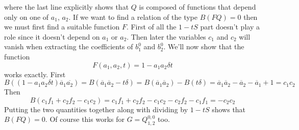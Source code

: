 \documentclass[12pt]{article}
\theoremstyle{definition} \newtheorem{definition}[theorem]{Definition}
\newcommand{\ol}[1]{\overline{#1}}
\newcommand{\Qf}[1]{Q_{1,2}^{#1}}
\begin{document}
where the last line explicitly shows that $Q$ is composed of functions that depend only on one of $a_1$, $a_2$. If we want to find a relation of the type $B(FQ) = 0$ then we must first find a suitable function $F$. First of all the $1-tS$ part doesn't play a role since it doesn't depend on $a_1$ or $a_2$. Then later the variables $c_1$ and $c_2$ will vanish when extracting the coefficients of $b_1^0$ and $b_2^0$. We'll now show that the function
\[
	F(a_1,a_2,t) = 1 - a_1 a_2 \delta t
\]
works exactly. First
\[
B((1 - a_1 a_2 \delta t)\ol{a}_1\ol{a_2}) = B(\ol{a}_1\ol{a}_2 - t \delta) = B(\ol{a}_1\ol{a}_2) - B(t \delta) = \ol{a}_1\ol{a}_2- \ol{a}_2-\ol{a}_1 + 1 = c_1 c_2
\]
Then
\[
	B(c_1 f_1+ c_2 f_2-c_1c_2) = c_1 f_1 + c_2 f_2 -c_1c_2 - c_2 f_2 - c_1 f_1 = -c_2 c_2
\]
Putting the two quantities together along with dividing by $1-tS$ shows that $B(FQ) = 0$. Of course this works for $G = \Qf{0,0}$ too.

\end{document}
